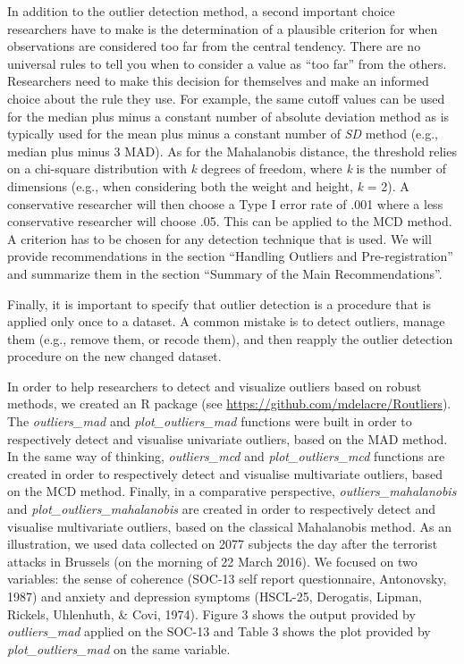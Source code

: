 \documentclass[man,floatsintext]{apa6}
\begin{document}
In addition to the outlier detection method, a second important choice researchers have to make is the determination of a plausible criterion for when observations are considered too far from the central tendency. There are no universal rules to tell you when to consider a value as \enquote{too far} from the others. Researchers need to make this decision for themselves and make an informed choice about the rule they use. For example, the same cutoff values can be used for the median plus minus a constant number of absolute deviation method as is typically used for the mean plus minus a constant number of \emph{SD} method (e.g., median plus minus 3 MAD). As for the Mahalanobis distance, the threshold relies on a chi-square distribution with \emph{k} degrees of freedom, where \emph{k} is the number of dimensions (e.g., when considering both the weight and height, \emph{k }= 2). A conservative researcher will then choose a Type I error rate of .001 where a less conservative researcher will choose .05. This can be applied to the MCD method. A criterion has to be chosen for any detection technique that is used. We will provide recommendations in the section \enquote{Handling Outliers and Pre-registration} and summarize them in the section \enquote{Summary of the Main Recommendations}.

Finally, it is important to specify that outlier detection is a procedure that is applied only once to a dataset. A common mistake is to detect outliers, manage them (e.g., remove them, or recode them), and then reapply the outlier detection procedure on the new changed dataset.

In order to help researchers to detect and visualize outliers based on robust methods, we created an R package (see \url{https://github.com/mdelacre/Routliers}). The \emph{outliers\_mad} and \emph{plot\_outliers\_mad} functions were built in order to respectively detect and visualise univariate outliers, based on the MAD method. In the same way of thinking, \emph{outliers\_mcd} and \emph{plot\_outliers\_mcd} functions are created in order to respectively detect and visualise multivariate outliers, based on the MCD method. Finally, in a comparative perspective, \emph{outliers\_mahalanobis} and \emph{plot\_outliers\_mahalanobis} are created in order to respectively detect and visualise multivariate outliers, based on the classical Mahalanobis method. As an illustration, we used data collected on 2077 subjects the day after the terrorist attacks in Brussels (on the morning of 22 March 2016). We focused on two variables: the sense of coherence (SOC-13 self report questionnaire, Antonovsky, 1987) and anxiety and depression symptoms (HSCL-25, Derogatis, Lipman, Rickels, Uhlenhuth, \& Covi, 1974). Figure 3 shows the output provided by \emph{outliers\_mad} applied on the SOC-13 and Table 3 shows the plot provided by \emph{plot\_outliers\_mad} on the same variable.
\end{document}
